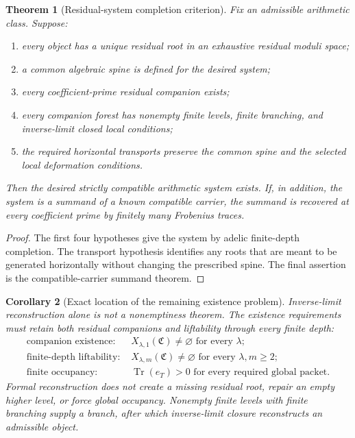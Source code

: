 \documentclass[11pt]{article}
\newtheorem{theorem}{Theorem}[section]
\newtheorem{corollary}[theorem]{Corollary}
\theoremstyle{definition}
\theoremstyle{remark}
\newcommand{\Tr}{\operatorname{Tr}}
\newcommand{\Compat}{\mathfrak C}
\begin{document}
\begin{theorem}[Residual-system completion criterion]
Fix an admissible arithmetic class.  Suppose:
\begin{enumerate}
\item every object has a unique residual root in an exhaustive residual moduli space;
\item a common algebraic spine is defined for the desired system;
\item every coefficient-prime residual companion exists;
\item every companion forest has nonempty finite levels, finite branching, and inverse-limit closed local conditions;
\item the required horizontal transports preserve the common spine and the selected local deformation conditions.
\end{enumerate}
Then the desired strictly compatible arithmetic system exists.  If, in addition, the system is a summand of a known compatible carrier, the summand is recovered at every coefficient prime by finitely many Frobenius traces.
\end{theorem}

\begin{proof}
The first four hypotheses give the system by adelic finite-depth completion.  The transport hypothesis identifies any roots that are meant to be generated horizontally without changing the prescribed spine.  The final assertion is the compatible-carrier summand theorem.
\end{proof}

\begin{corollary}[Exact location of the remaining existence problem]
Inverse-limit reconstruction alone is not a nonemptiness theorem.  The existence requirements must retain both residual companions and liftability through every finite depth:
\[
\boxed{
\begin{aligned}
\text{companion existence: }&X_{\lambda,1}(\Compat)\ne\varnothing
\text{ for every }\lambda;\\
\text{finite-depth liftability: }&X_{\lambda,m}(\Compat)\ne\varnothing
\text{ for every }\lambda,m\ge2;\\
\text{finite occupancy: }&\Tr(e_T)>0
\text{ for every required global packet.}
\end{aligned}}
\]
Formal reconstruction does not create a missing residual root, repair an empty higher level, or force global occupancy.  Nonempty finite levels with finite branching supply a branch, after which inverse-limit closure reconstructs an admissible object.
\end{corollary}
\end{document}
